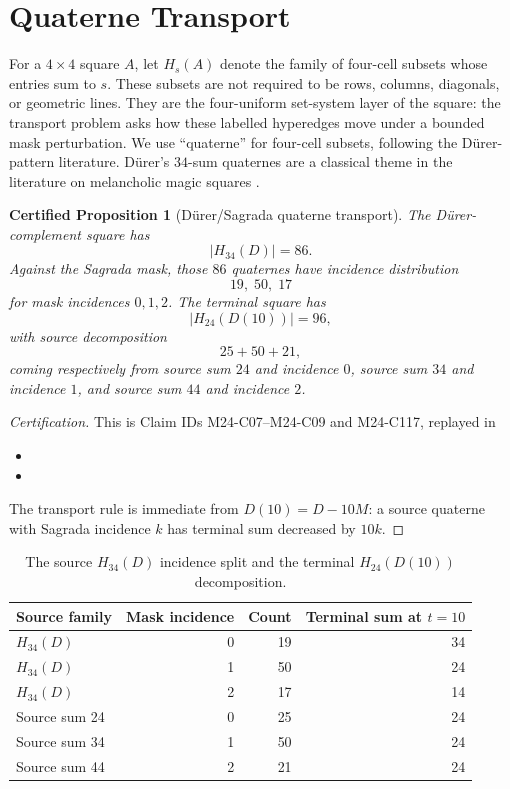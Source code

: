 \documentclass[11pt,a4paper]{article}
\newtheorem{certprop}[theorem]{Certified Proposition}
\theoremstyle{definition}
\theoremstyle{remark}
\newcommand{\Durer}{D\"urer\xspace}
\begin{document}
\section{Quaterne Transport}
\label{sec:quaternes}

For a \(4\times4\) square \(A\), let \(H_s(A)\) denote the family of
four-cell subsets whose entries sum to \(s\).  These subsets are not required
to be rows, columns, diagonals, or geometric lines.  They are the
four-uniform set-system layer of the square: the transport problem asks how
these labelled hyperedges move under a bounded mask perturbation.  We use
``quaterne'' for four-cell subsets, following the \Durer-pattern literature.
\Durer's \(34\)-sum quaternes are a classical theme in the literature on
melancholic magic squares \cite{trenklerMelancholic}.

\begin{certprop}[\Durer/Sagrada quaterne transport]
\label{prop:quaterne-transport}
The \Durer-complement square has
\[
|H_{34}(D)|=86.
\]
Against the Sagrada mask, those \(86\) quaternes have incidence distribution
\[
19,\;50,\;17
\]
for mask incidences \(0,1,2\).  The terminal square has
\[
|H_{24}(D(10))|=96,
\]
with source decomposition
\[
25+50+21,
\]
coming respectively from source sum \(24\) and incidence \(0\), source sum
\(34\) and incidence \(1\), and source sum \(44\) and incidence \(2\).
\end{certprop}

\begin{proof}[Certification]
This is Claim IDs M24-C07--M24-C09 and M24-C117, replayed in
\begin{itemize}[leftmargin=*]
\item {}
\item {}
\end{itemize}
The transport rule is immediate from \(D(10)=D-10M\): a source quaterne with
Sagrada incidence \(k\) has terminal sum decreased by \(10k\).
\end{proof}

\begin{table}[htbp]
\centering
\begin{tabular}{lrrr}
\toprule
Source family & Mask incidence & Count & Terminal sum at \(t=10\)\\
\midrule
\(H_{34}(D)\) & 0 & 19 & 34\\
\(H_{34}(D)\) & 1 & 50 & 24\\
\(H_{34}(D)\) & 2 & 17 & 14\\
\midrule
Source sum 24 & 0 & 25 & 24\\
Source sum 34 & 1 & 50 & 24\\
Source sum 44 & 2 & 21 & 24\\
\bottomrule
\end{tabular}
\caption{The source \(H_{34}(D)\) incidence split and the terminal
\(H_{24}(D(10))\) decomposition.}
\label{tab:quaterne-transport}
\end{table}
\end{document}

